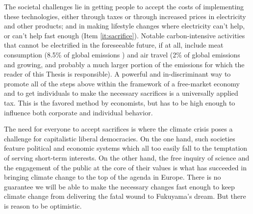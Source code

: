The societal challenges lie in getting people to accept the costs of implementing these technologies, either through taxes or through increased prices in electricity and other products; and in making lifestyle changes where electricity can't help, or can't help fast enough (Item \ref{it:sacrifice}). Notable carbon-intensive activities that cannot be electrified in the foreseeable future, if at all, include meat consumption (8.5\% of global emissions \cite{Caro2017}) and air travel (2\% of global emissions and growing\cite{CarbonBrief_aviation}, and probably a much larger portion of the emissions for which the reader of this Thesis is responsible). A powerful and in-discriminant way to promote all of the steps above within the framework of a free-market economy and to get individuals to make the necessary sacrifices is a universally applied  tax. This is the favored method by economists\cite{CarbonTax_Economist}, but has to be high enough to influence both corporate and individual behavior.

The need for everyone to accept sacrifices is where the climate crisis poses a challenge for capitalistic liberal democracies. On the one hand, such societies feature political and economic systems which all too easily fall to the temptation of serving short-term interests. On the other hand, the free inquiry of science and the engagement of the public at the core of their values is what has succeeded in bringing climate change to the top of the agenda in Europe. There is no guarantee we will be able to make the necessary changes fast enough to keep climate change from delivering the fatal wound to Fukuyama's dream. But there is reason to be optimistic.



 






